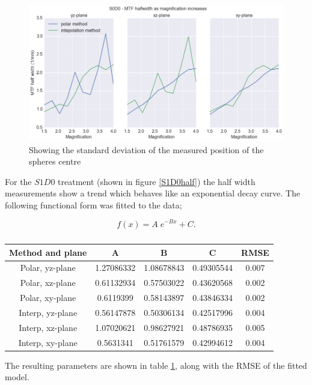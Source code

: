 \documentclass[
  twoside,
  11pt, a4paper,
  footinclude=true,
  headinclude=true,
  cleardoublepage=empty
]{scrbook}
\begin{document}
\begin{figure}[h!]
  \centering
    \includegraphics[width=\textwidth]{figures/S0D0half.png}
    \caption{Showing the standard deviation of the measured position of the spheres centre}
        \label{S0D0half}
\end{figure}

For the $S1D0$ treatment (shown in figure \ref{S1D0half}) the half width measurements show a trend which behaves like an exponential decay curve. The following functional form was fitted to the data;

\[
f(x) = A \; e^{-Bx} + C.
\]


\begin{table}
\caption{}
\label{loghalffit}
\begin{tabular}{c|cccc}
\toprule
{} Method and plane &     A &     B &     C  & RMSE\\
\midrule
Polar, yz-plane         &  1.27086332  &1.08678843 & 0.49305544 & 0.007\\
Polar, xz-plane        &  0.61132934 & 0.57503022 & 0.43620568 & 0.002\\
Polar, xy-plane      &  0.6119399   & 0.58143897 & 0.43846334 & 0.002\\
Interp, yz-plane       &  0.56147878 & 0.50306134 & 0.42517996 & 0.004\\
Interp, xz-plane       &  1.07020621 & 0.98627921 & 0.48786935 & 0.005\\
Interp, xy-plane       &  0.5631341  & 0.51761579 & 0.42994612  & 0.004\\
\bottomrule
\end{tabular}
\end{table}

The resulting parameters are shown in table \ref{loghalffit}, along with the RMSE of the fitted model.
\end{document}
